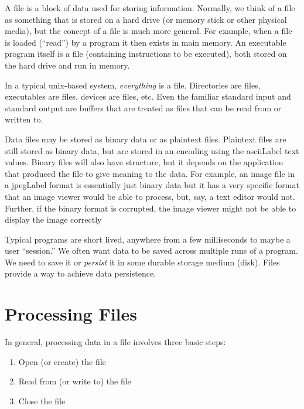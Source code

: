 

A  \gls{file} is a block of data used for storing information.
Normally, we think of a file as something that is stored on 
a hard drive (or memory stick or other physical media), but the
concept of a file is much more general.  For example, when
a file is loaded (``read'') by a program it then exists in 
main memory.  An executable program itself is a file 
(containing instructions to be executed), both stored on 
the hard drive and run in memory.

In a typical unix-based system, \emph{everything} is a
file.  Directories are files, executables are files, 
devices are files, etc.  Even the familiar 
standard input and standard output are buffers that
are treated as files that can be read from or written to.

Data files may be stored as binary data or as plaintext files.
Plaintext files are still stored as binary data, 
but are stored in an encoding using the \gls{asciiLabel}
text values.  Binary files will also have structure, but
it depends on the application that produced the file to
give meaning to the data.  For example, an image file
in a \gls{jpegLabel} format is essentially just binary
data but it has a very specific format that an
image viewer would be able to process, but, say, a text
editor would not.  Further, if the binary format is
corrupted, the image viewer might not be able to
display the image correctly

Typical programs are short lived, anywhere from a few milliseconds 
to maybe a user ``session.'' 
We often want data to be saved across multiple runs of a program.  
We need to save it or \emph{persist} it in some durable storage 
medium (disk).  Files provide a way to achieve data 
\gls{persistence}.

\section{Processing Files}

In general, processing data in a file involves three basic
steps:
\begin{enumerate}
  \item Open (or create) the file
  \item Read from (or write to) the file
  \item Close the file
\end{enumerate}

